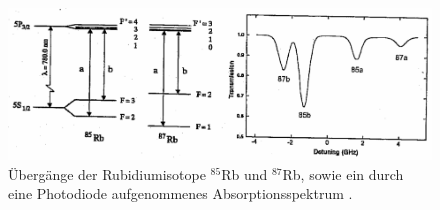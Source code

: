 \begin{figure}[htb]
  \centering
  \includegraphics{images/uebergaenge.pdf}
  \caption{Übergänge der Rubidiumisotope $^{85}$Rb und $^{87}$Rb, sowie ein durch
  eine Photodiode aufgenommenes Absorptionsspektrum \cite{anleitung}.}
  \label{fig:ueber}
\end{figure}
